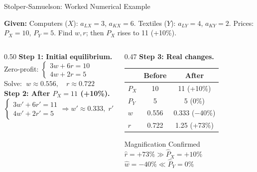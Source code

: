 \documentclass[aspectratio=169]{beamer}
\begin{document}
\begin{frame}[shrink=12]{Stolper-Samuelson: Worked Numerical Example}
\begin{worked}
\small\textbf{Given:} Computers ($X$): $a_{LX}=3$, $a_{KX}=6$.
Textiles ($Y$): $a_{LY}=4$, $a_{KY}=2$.
Prices: $P_X=10$, $P_Y=5$.
Find $w,r$; then $P_X$ rises to 11 (+10\%).
\end{worked}
\vspace{0.2em}
\begin{columns}[T]
\begin{column}{0.50\textwidth}
\textbf{Step 1: Initial equilibrium.}\\[0.1em]
Zero-profit: $\begin{cases}3w + 6r = 10\\4w + 2r = 5\end{cases}$\\[0.2em]
Solve: $\;\boxed{w\approx0.556,\quad r\approx0.722}$\\[0.4em]
\textbf{Step 2: After $P_X=11$ (+10\%).}\\[0.1em]
$\begin{cases}3w' + 6r' = 11\\4w' + 2r' = 5\end{cases}
\Rightarrow w'\approx0.333,\; r'\approx1.25$
\end{column}
\begin{column}{0.47\textwidth}
\textbf{Step 3: Real changes.}
\begin{center}\small
\begin{tabular}{lcc}
\toprule
& \textbf{Before} & \textbf{After}\\
\midrule
$P_X$ & 10 & 11 (+10\%)\\
$P_Y$ & 5 & 5 (0\%)\\
$w$ & 0.556 & 0.333 ($-$40\%)\\
$r$ & 0.722 & 1.25 (+73\%)\\
\bottomrule
\end{tabular}
\end{center}
\begin{insight}{Magnification Confirmed}
\small$\hat{r}=+73\%\gg\hat{P}_X=+10\%$\\
$\hat{w}=-40\%\ll\hat{P}_Y=0\%$
\end{insight}
\end{column}
\end{columns}
\end{frame}
\end{document}
